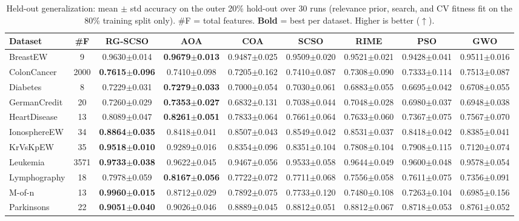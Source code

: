 \begin{table}[t]
\centering
\caption{Held-out generalization: mean $\pm$ std accuracy on the outer 20\% hold-out over 30 runs (relevance prior, search, and CV fitness fit on the 80\% training split only). \#F = total features. \textbf{Bold} = best per dataset. Higher is better ($\uparrow$).}
\label{tab:heldout_acc}
\scriptsize
\setlength{\tabcolsep}{3.5pt}
\begin{tabular}{lcccccccc}
\toprule
Dataset & \#F & RG-SCSO & AOA & COA & SCSO & RIME & PSO & GWO \\
\midrule
BreastEW & 9 & 0.9630$\pm$0.014 & \textbf{0.9679$\pm$0.013} & 0.9487$\pm$0.025 & 0.9509$\pm$0.020 & 0.9521$\pm$0.021 & 0.9428$\pm$0.041 & 0.9511$\pm$0.016 \\
ColonCancer & 2000 & \textbf{0.7615$\pm$0.096} & 0.7410$\pm$0.098 & 0.7205$\pm$0.162 & 0.7410$\pm$0.087 & 0.7308$\pm$0.090 & 0.7333$\pm$0.114 & 0.7513$\pm$0.087 \\
Diabetes & 8 & 0.7229$\pm$0.031 & \textbf{0.7279$\pm$0.033} & 0.7000$\pm$0.054 & 0.7030$\pm$0.061 & 0.6883$\pm$0.055 & 0.6695$\pm$0.042 & 0.6708$\pm$0.055 \\
GermanCredit & 20 & 0.7260$\pm$0.029 & \textbf{0.7353$\pm$0.027} & 0.6832$\pm$0.131 & 0.7038$\pm$0.044 & 0.7048$\pm$0.028 & 0.6980$\pm$0.037 & 0.6948$\pm$0.038 \\
HeartDisease & 13 & 0.8089$\pm$0.047 & \textbf{0.8261$\pm$0.051} & 0.7833$\pm$0.064 & 0.7661$\pm$0.064 & 0.7633$\pm$0.060 & 0.7367$\pm$0.075 & 0.7567$\pm$0.070 \\
IonosphereEW & 34 & \textbf{0.8864$\pm$0.035} & 0.8418$\pm$0.041 & 0.8507$\pm$0.043 & 0.8549$\pm$0.042 & 0.8531$\pm$0.037 & 0.8418$\pm$0.042 & 0.8385$\pm$0.041 \\
KrVsKpEW & 35 & \textbf{0.9518$\pm$0.010} & 0.9289$\pm$0.016 & 0.8354$\pm$0.096 & 0.8351$\pm$0.104 & 0.7808$\pm$0.104 & 0.7908$\pm$0.115 & 0.7120$\pm$0.074 \\
Leukemia & 3571 & \textbf{0.9733$\pm$0.038} & 0.9622$\pm$0.045 & 0.9467$\pm$0.056 & 0.9533$\pm$0.058 & 0.9644$\pm$0.049 & 0.9600$\pm$0.048 & 0.9578$\pm$0.054 \\
Lymphography & 18 & 0.7978$\pm$0.059 & \textbf{0.8167$\pm$0.056} & 0.7722$\pm$0.072 & 0.7711$\pm$0.068 & 0.7556$\pm$0.058 & 0.7611$\pm$0.075 & 0.7356$\pm$0.091 \\
M-of-n & 13 & \textbf{0.9960$\pm$0.015} & 0.8712$\pm$0.029 & 0.7892$\pm$0.075 & 0.7733$\pm$0.120 & 0.7480$\pm$0.108 & 0.7263$\pm$0.104 & 0.6985$\pm$0.156 \\
Parkinsons & 22 & \textbf{0.9051$\pm$0.040} & 0.9026$\pm$0.046 & 0.8889$\pm$0.045 & 0.8812$\pm$0.051 & 0.8812$\pm$0.067 & 0.8718$\pm$0.053 & 0.8761$\pm$0.052 \\

\end{tabular}
\end{table}
